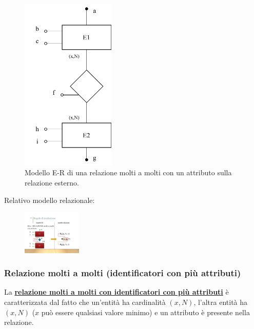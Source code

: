 \documentclass[a4paper]{article}
\begin{document}
	\begin{figure}[!htp]
		\centering
		\includegraphics[width=0.4\textwidth]{img/relazionale_molti_a_molti_att_relazione.pdf}
		\caption{Modello E-R di una relazione molti a molti con un attributo sulla relazione esterno.}
	\end{figure}
	
	\noindent
	Relativo modello relazionale:
	
	\begin{figure}[!htp]
		\centering
		\includegraphics[width=0.25\textwidth]{img/relazionale_molti_a_molti_att_relazione2.pdf}
	\end{figure}

	\newpage
	
	\subsubsection{Relazione molti a molti (identificatori con più attributi)}
	
	La \textcolor{Red3}{\textbf{\underline{relazione molti a molti con identificatori con più attributi}}} è caratterizzata dal fatto che un'entità ha cardinalità $\left(x,N\right)$, l'altra entità ha $\left(x,N\right)$ ($x$ può essere qualsiasi valore minimo) e un attributo è presente nella relazione.
	
\end{document}
